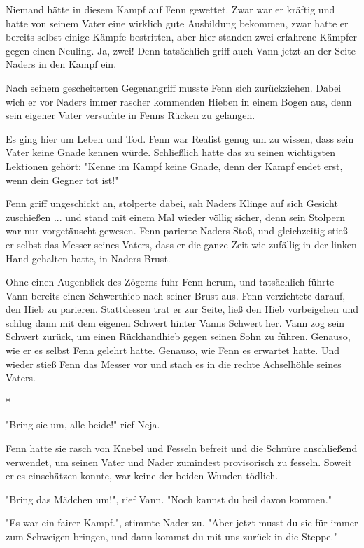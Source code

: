 \documentclass[10pt, a4paper, oneside]{book}
\begin{document}
\begin{multicols}{2}
Niemand hätte in diesem Kampf auf Fenn gewettet. Zwar war er kräftig und hatte von seinem Vater eine wirklich gute Ausbildung bekommen, zwar hatte er bereits selbst einige Kämpfe bestritten, aber hier standen zwei erfahrene Kämpfer gegen einen Neuling. Ja, zwei! Denn tatsächlich griff auch Vann jetzt an der Seite Naders in den Kampf ein.

Nach seinem gescheiterten Gegenangriff musste Fenn sich zurückziehen. Dabei wich er vor Naders immer rascher kommenden Hieben in einem Bogen aus, denn sein eigener Vater versuchte in Fenns Rücken zu gelangen.

Es ging hier um Leben und Tod. Fenn war Realist genug um zu wissen, dass sein Vater keine Gnade kennen würde. Schließlich hatte das zu seinen wichtigsten Lektionen gehört: "Kenne im Kampf keine Gnade, denn der Kampf endet erst, wenn dein Gegner tot ist!"

Fenn griff ungeschickt an, stolperte dabei, sah Naders Klinge auf sich Gesicht zuschießen ... und stand mit einem Mal wieder völlig sicher, denn sein Stolpern war nur vorgetäuscht gewesen. Fenn parierte Naders Stoß, und gleichzeitig stieß er selbst das Messer seines Vaters, dass er die ganze Zeit wie zufällig in der linken Hand gehalten hatte, in Naders Brust.

Ohne einen Augenblick des Zögerns fuhr Fenn herum, und tatsächlich führte Vann bereits einen Schwerthieb nach seiner Brust aus. Fenn verzichtete darauf, den Hieb zu parieren. Stattdessen trat er zur Seite, ließ den Hieb vorbeigehen und schlug dann mit dem eigenen Schwert hinter Vanns Schwert her. Vann zog sein Schwert zurück, um einen Rückhandhieb gegen seinen Sohn zu führen. Genauso, wie er es selbst Fenn gelehrt hatte. Genauso, wie Fenn es erwartet hatte. Und wieder stieß Fenn das Messer vor und stach es in die rechte Achselhöhle seines Vaters.

\begin{center}
    *
\end{center}

"Bring sie um, alle beide!" rief Neja.

Fenn hatte sie rasch von Knebel und Fesseln befreit und die Schnüre anschließend verwendet, um seinen Vater und Nader zumindest provisorisch zu fesseln. Soweit er es einschätzen konnte, war keine der beiden Wunden tödlich.

"Bring das Mädchen um!", rief Vann. "Noch kannst du heil davon kommen."

"Es war ein fairer Kampf.", stimmte Nader zu. "Aber jetzt musst du sie für immer zum Schweigen bringen, und dann kommst du mit uns zurück in die Steppe."


\end{multicols}
\end{document}

